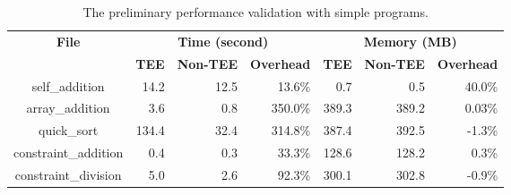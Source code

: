 


\begin{table*}[htbp]
\centering
\caption{The preliminary performance validation with simple programs.}\label{tab:validate}
\begin{tabular}{c r r r r r r}
\toprule
\multirow{2}{*}{\textbf{File}} & \multicolumn{3}{c}{\textbf{Time (second)}} & \multicolumn{3}{c}{\textbf{Memory (MB)}} \\

 & \textbf{TEE} & \textbf{Non-TEE} & \textbf{Overhead} & \textbf{TEE} & \textbf{Non-TEE} & \textbf{Overhead}\\
\midrule

self\_addition & 14.2 & 12.5 & 13.6\% & 0.7 & 0.5 & 40.0\%\\

array\_addition & 3.6 & 0.8 & 350.0\% & 389.3 & 389.2 & 0.03\% \\

quick\_sort & 134.4 & 32.4 & 314.8\% & 387.4 & 392.5 & -1.3\%\\

constraint\_addition & 0.4 & 0.3 & 33.3\% & 128.6 & 128.2 & 0.3\%\\

constraint\_division & 5.0 & 2.6 & 92.3\% & 300.1 & 302.8 & -0.9\%\\

\bottomrule
\end{tabular}
\end{table*}